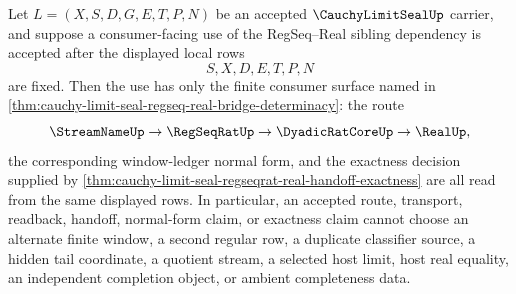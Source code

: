 \begin{corollary}
\label{cor:cauchy-limit-seal-regseq-real-sibling-dependency-determinacy}
Let $L=(X,S,D,G,E,T,P,N)$ be an accepted $\CauchyLimitSealUp$ carrier, and suppose a consumer-facing use of the RegSeq--Real sibling dependency is accepted after the displayed local rows
$$
S,X,D,E,T,P,N
$$
are fixed. Then the use has only the finite consumer surface named in \autoref{thm:cauchy-limit-seal-regseq-real-bridge-determinacy}: the route
$$
\StreamNameUp \to \RegSeqRatUp \to \DyadicRatCoreUp \to \RealUp,
$$
the corresponding window-ledger normal form, and the exactness decision supplied by \autoref{thm:cauchy-limit-seal-regseqrat-real-handoff-exactness} are all read from the same displayed rows. In particular, an accepted route, transport, readback, handoff, normal-form claim, or exactness claim cannot choose an alternate finite window, a second regular row, a duplicate classifier source, a hidden tail coordinate, a quotient stream, a selected host limit, host real equality, an independent completion object, or ambient completeness data.
\end{corollary}
